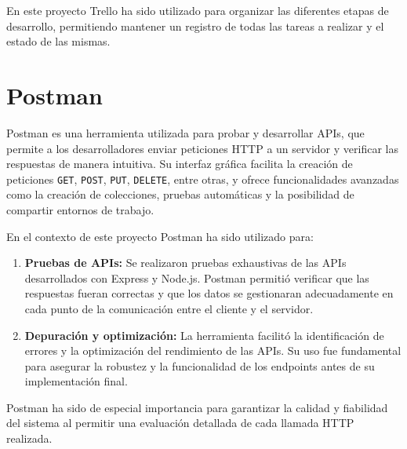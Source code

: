 \documentclass[a4paper, 12pt]{book}
\begin{document}
En este proyecto Trello ha sido utilizado para organizar las diferentes etapas de desarrollo, permitiendo mantener un registro de todas las tareas a realizar y el estado de las mismas. 

\section{Postman} Postman es una herramienta utilizada para probar y desarrollar APIs, que permite a los desarrolladores enviar peticiones HTTP a un servidor y verificar las respuestas de manera intuitiva. Su interfaz gráfica facilita la creación de peticiones \texttt{GET}, \texttt{POST}, \texttt{PUT}, \texttt{DELETE}, entre otras, y ofrece funcionalidades avanzadas como la creación de colecciones, pruebas automáticas y la posibilidad de compartir entornos de trabajo.

En el contexto de este proyecto Postman ha sido utilizado para:

\begin{enumerate}
    \item \textbf{Pruebas de APIs:} Se realizaron pruebas exhaustivas de las APIs desarrollados con Express y Node.js. Postman permitió verificar que las respuestas fueran correctas y que los datos se gestionaran adecuadamente en cada punto de la comunicación entre el cliente y el servidor.
    \item \textbf{Depuración y optimización:} La herramienta facilitó la identificación de errores y la optimización del rendimiento de las APIs. Su uso fue fundamental para asegurar la robustez y la funcionalidad de los endpoints antes de su implementación final.
\end{enumerate}

Postman ha sido de especial importancia para garantizar la calidad y fiabilidad del sistema al permitir una evaluación detallada de cada llamada HTTP realizada.

\label{sec:seccion1}

\end{document}
